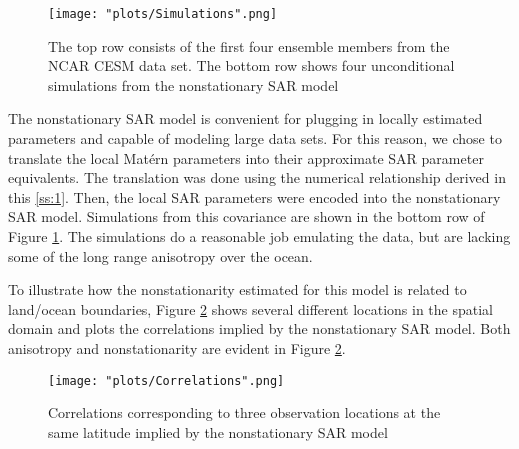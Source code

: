 \documentclass[review]{elsarticle}
\begin{document}
\begin{figure}
    \centering 
   \texttt{[image: "plots/Simulations".png]}
    \caption{The top row consists of the first four ensemble members from the NCAR CESM data set. The bottom row shows four unconditional simulations from the nonstationary SAR model}
    \label{f:4}
\end{figure}



The nonstationary SAR model is convenient for plugging in locally estimated parameters and capable of modeling large data sets. For this reason, we chose to translate the local Mat\'ern parameters into their approximate SAR parameter equivalents. The translation was done using the numerical relationship derived in this \ref{ss:1}. Then, the local SAR parameters were encoded into the nonstationary SAR model. Simulations from this covariance are shown in the bottom row of Figure \ref{f:4}. The simulations do a reasonable job emulating the data, but are lacking some of the long range anisotropy over the ocean.



To illustrate how the nonstationarity estimated for this model is related to land/ocean boundaries, Figure \ref{f:5} shows several different locations in the spatial domain and plots the correlations implied by the nonstationary SAR model. Both anisotropy and nonstationarity are evident in Figure \ref{f:5}. %



\begin{figure}
    \centering
    \texttt{[image: "plots/Correlations".png]} %
    \caption{Correlations corresponding to three observation locations at the same latitude implied by the nonstationary SAR model}
    \label{f:5}
\end{figure}
\end{document}
